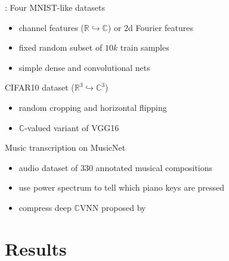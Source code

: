 \documentclass{beamer}
\newcommand{\real}{\mathbb{R}}
\newcommand{\cplx}{\mathbb{C}}
\begin{document}
\begin{frame}[t]{\insertsection: \insertsubsection}
  Four MNIST-like datasets
  \begin{itemize}
    \item channel features ($\real \hookrightarrow \cplx$) or $2$d Fourier features
    \item fixed random subset of $10k$ train samples
    \item simple dense and convolutional nets
  \end{itemize}

  \pause
  \medskip
  CIFAR10 dataset ($\real^3 \hookrightarrow \cplx^3$)
  \begin{itemize}
    \item random cropping and horizontal flipping
    \item $\cplx$-valued variant of VGG16 {\tiny \citep{simonyan_very_2015}}
  \end{itemize}

  \pause
  \medskip
  Music transcription on MusicNet {\tiny \citep{thickstun_learning_2017}}
  \begin{itemize}
    \item audio dataset of $330$ annotated musical compositions
    \item use power spectrum to tell which piano keys are pressed
    \item compress deep $\cplx$VNN proposed by \citep{trabelsi_deep_2018}
  \end{itemize}

\end{frame}



\section{Results} %
\label{sec:results}
\end{document}
